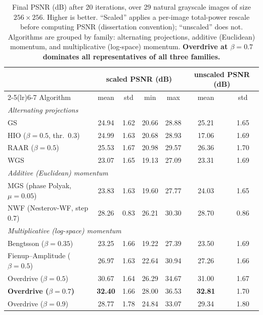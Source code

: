 \documentclass[11pt,a4paper]{article}
\begin{document}
\begin{table}[t]
\centering
\caption{Final PSNR (dB) after 20 iterations, over 29 natural grayscale
images of size $256\times 256$. Higher is better. ``Scaled'' applies a
per-image total-power rescale before computing PSNR (dissertation
convention); ``unscaled'' does not. Algorithms are grouped by family:
alternating projections, additive (Euclidean) momentum, and multiplicative
(log-space) momentum. \textbf{Overdrive at $\beta=0.7$ dominates all
representatives of all three families.}}
\label{tab:results}
\small
\begin{tabular}{lcccccc}
\toprule
& \multicolumn{4}{c}{scaled PSNR (dB)} & \multicolumn{2}{c}{unscaled PSNR (dB)} \\
\cmidrule(lr){2-5}\cmidrule(lr){6-7}
Algorithm & mean & std & min & max & mean & std \\\midrule
\multicolumn{7}{l}{\emph{Alternating projections}}\\
GS \cite{Gerchberg1972}                            & 24.94 & 1.62 & 20.66 & 28.88 & 25.21 & 1.65 \\
HIO \cite{Fienup1982} ($\beta=0.5$, thr.\ $0.3$)   & 24.99 & 1.63 & 20.68 & 28.93 & 17.06 & 1.69 \\
RAAR \cite{Luke2005} ($\beta=0.5$)                 & 25.53 & 1.67 & 20.98 & 29.57 & 26.36 & 1.70 \\
WGS \cite{DiLeonardo2007}                          & 23.07 & 1.65 & 19.13 & 27.09 & 23.31 & 1.69 \\
\midrule
\multicolumn{7}{l}{\emph{Additive (Euclidean) momentum}}\\
MGS (phase Polyak, $\mu=0.05$)                     & 23.83 & 1.63 & 19.60 & 27.77 & 24.03 & 1.65 \\
NWF \cite{Candes2014} (Nesterov-WF, step $0.7$)    & 28.26 & 0.83 & 26.21 & 30.30 & 28.70 & 0.86 \\
\midrule
\multicolumn{7}{l}{\emph{Multiplicative (log-space) momentum}}\\
Bengtsson \cite{Bengtsson1998} ($\beta=0.35$)      & 23.25 & 1.66 & 19.22 & 27.39 & 23.50 & 1.69 \\
Fienup--Amplitude \cite{Fienup1978} ($\beta=0.5$)  & 26.97 & 1.63 & 22.64 & 30.94 & 27.26 & 1.66 \\
Overdrive ($\beta=0.5$)                            & 30.67 & 1.64 & 26.29 & 34.67 & 31.00 & 1.67 \\
\textbf{Overdrive ($\beta=0.7$)}                   & \textbf{32.40} & 1.66 & 28.00 & 36.53 & \textbf{32.81} & 1.70 \\
Overdrive ($\beta=0.9$)                            & 28.77 & 1.78 & 24.84 & 33.07 & 29.34 & 1.80 \\
\bottomrule
\end{tabular}
\end{table}
\end{document}
